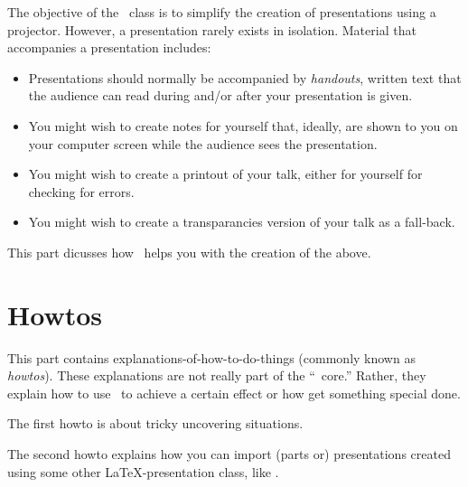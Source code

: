 \documentclass{ltxdoc}
\begin{document}
The objective of the \beamer\ class is to simplify the creation of presentations using a projector. However, a presentation rarely exists in isolation. Material that accompanies a presentation includes:
\begin{itemize}
\item
  Presentations should normally be accompanied by \emph{handouts}, written text that the audience can read during and/or after your presentation is given.
\item
  You might wish to create notes for yourself that, ideally, are shown to you on your computer screen while the audience sees the presentation.
\item
  You might wish to create a printout of your talk, either for yourself for checking for errors.
\item
  You might wish to create a transparancies version of your talk as a fall-back.
\end{itemize}

This part dicusses how \beamer\ helps you with the creation of the above.








\part{Howtos}

This part contains explanations-of-how-to-do-things (commonly known as \emph{howtos}). These explanations are not really part of the ``\beamer\ core.'' Rather, they explain how to use \beamer\ to achieve a certain effect or how get something special done.

The first howto is about tricky uncovering situations.

The second howto explains how you can import (parts or) presentations created using some other \LaTeX-presentation class, like \prosper.





\printindex
\end{document}
